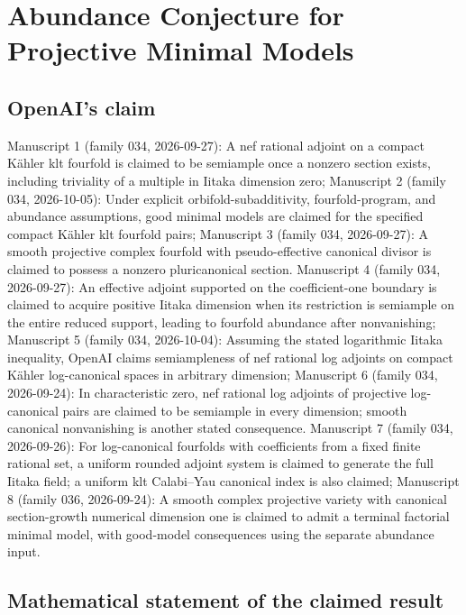 \documentclass[11pt]{article}
\begin{document}
\section*{Abundance Conjecture for Projective Minimal Models}

\subsection{OpenAI's claim}
Manuscript 1 (family 034, 2026-09-27): A nef rational adjoint on a compact Kähler klt fourfold is claimed to be semiample once a nonzero section exists, including triviality of a multiple in Iitaka dimension zero; Manuscript 2 (family 034, 2026-10-05): Under explicit orbifold-subadditivity, fourfold-program, and abundance assumptions, good minimal models are claimed for the specified compact Kähler klt fourfold pairs; Manuscript 3 (family 034, 2026-09-27): A smooth projective complex fourfold with pseudo-effective canonical divisor is claimed to possess a nonzero pluricanonical section. Manuscript 4 (family 034, 2026-09-27): An effective adjoint supported on the coefficient-one boundary is claimed to acquire positive Iitaka dimension when its restriction is semiample on the entire reduced support, leading to fourfold abundance after nonvanishing; Manuscript 5 (family 034, 2026-10-04): Assuming the stated logarithmic Iitaka inequality, OpenAI claims semiampleness of nef rational log adjoints on compact Kähler log-canonical spaces in arbitrary dimension; Manuscript 6 (family 034, 2026-09-24): In characteristic zero, nef rational log adjoints of projective log-canonical pairs are claimed to be semiample in every dimension; smooth canonical nonvanishing is another stated consequence. Manuscript 7 (family 034, 2026-09-26): For log-canonical fourfolds with coefficients from a fixed finite rational set, a uniform rounded adjoint system is claimed to generate the full Iitaka field; a uniform klt Calabi--Yau canonical index is also claimed; Manuscript 8 (family 036, 2026-09-24): A smooth complex projective variety with canonical section-growth numerical dimension one is claimed to admit a terminal factorial minimal model, with good-model consequences using the separate abundance input.

\subsection{Mathematical statement of the claimed result}
\end{document}
